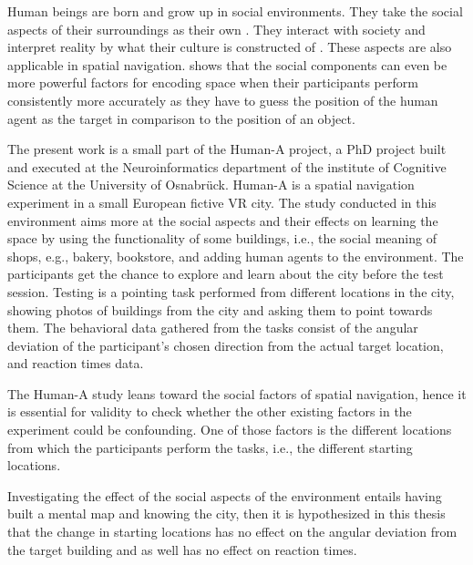 Human beings are born and grow up in social environments. They take the social aspects of their surroundings as their own \autocite{berger1967luckman}. They interact with society and interpret reality by what their culture is constructed of \autocite{SIEGEL19759}. These aspects are also applicable in spatial navigation. \textcite{kuehn2018social} shows that the social components can even be more powerful factors for encoding space when their participants perform consistently more accurately as they have to guess the position of the human agent as the target in comparison to the position of an object.

The present work is a small part of the Human-A project, a PhD project built and executed at the Neuroinformatics department of the institute of Cognitive Science at the University of Osnabrück. Human-A is a spatial navigation experiment in a small European fictive VR city. The study conducted in this environment aims more at the social aspects and their effects on learning the space by using the functionality of some buildings, i.e., the social meaning of shops, e.g., bakery, bookstore, and adding human agents to the environment. The participants get the chance to explore and learn about the city before the test session. Testing is a pointing task performed from different locations in the city, showing photos of buildings from the city and asking them to point towards them. The behavioral data gathered from the tasks consist of the angular deviation of the participant's chosen direction from the actual target location, and reaction times data.

The Human-A study leans toward the social factors of spatial navigation, hence it is essential for validity to check whether the other existing factors in the experiment could be confounding. One of those factors is the different locations from which the participants perform the tasks, i.e., the different starting locations. 

Investigating the effect of the social aspects of the environment entails having built a mental map and knowing the city, then it is hypothesized in this thesis that the change in starting locations has no effect on the angular deviation from the target building and as well has no effect on reaction times.
